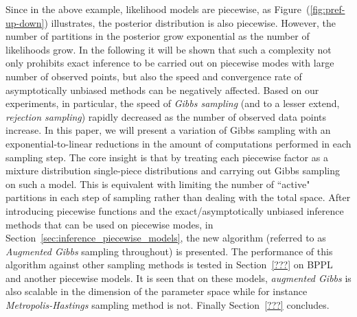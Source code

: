 \vspace{2mm}
Since in the above example, likelihood  models are piecewise, 
as Figure~(\ref{fig:pref-up-down}) illustrates, the posterior distribution is also piecewise.
However, the number of partitions in the posterior grow exponential as the number of likelihoods grow.
In the following it will be shown that such a complexity not only prohibits exact inference to be carried out on piecewise modes with large number of observed points, but also the speed and convergence rate of asymptotically unbiased methods can be negatively affected.
Based on our experiments, in particular, the speed of \emph{Gibbs sampling} 
(and to a lesser extend, \emph{rejection sampling}) rapidly decreased as the number of observed data points increase.
In this paper, we will present a variation of Gibbs sampling with an exponential-to-linear reductions in the amount of computations performed in each sampling step. 
The core insight is that by treating each piecewise factor as a mixture distribution single-piece distributions and carrying out Gibbs sampling on such a model. 
This is equivalent with limiting the number of ``active" partitions in each step of sampling rather than dealing with the total space.
After introducing piecewise functions and the exact/asymptotically unbiased inference methods that can be used on piecewise modes, in Section~\ref{sec:inference_piecewise_models}, the new algorithm (referred to as \emph{Augmented Gibbs} sampling throughout) is presented.
The performance of this algorithm against other sampling methods is tested in Section~\ref{???} 
on BPPL and another piecewise models. 
It is seen that on these models, \emph{augmented Gibbs} is also scalable in the dimension of the parameter space while for instance \emph{Metropolis-Hastings} sampling method is not.
Finally Section~\ref{???} concludes.

